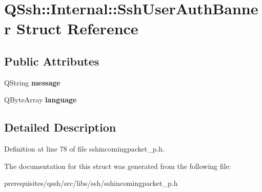 \hypertarget{struct_q_ssh_1_1_internal_1_1_ssh_user_auth_banner}{}\section{Q\+Ssh\+:\+:Internal\+:\+:Ssh\+User\+Auth\+Banner Struct Reference}
\label{struct_q_ssh_1_1_internal_1_1_ssh_user_auth_banner}
\subsection*{Public Attributes}
\begin{DoxyCompactItemize}
\item 
\mbox{\label{struct_q_ssh_1_1_internal_1_1_ssh_user_auth_banner_a5d3aceeab796607239a4945fe541b64d}} 
Q\+String {\bfseries message}
\item 
\mbox{\label{struct_q_ssh_1_1_internal_1_1_ssh_user_auth_banner_abec7b844c1ad0f156707f2bc74c42dbe}} 
Q\+Byte\+Array {\bfseries language}
\end{DoxyCompactItemize}


\subsection{Detailed Description}


Definition at line 78 of file sshincomingpacket\+\_\+p.\+h.



The documentation for this struct was generated from the following file\+:\begin{DoxyCompactItemize}
\item 
prerequisites/qssh/src/libs/ssh/sshincomingpacket\+\_\+p.\+h\end{DoxyCompactItemize}
